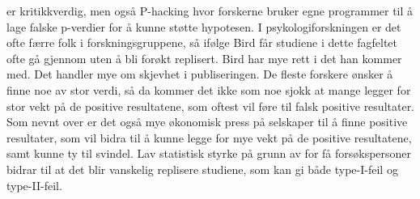 \documentclass[
]{book}
\begin{document}
er kritikkverdig, men også P-hacking hvor forskerne bruker egne programmer til å lage falske p-verdier for å kunne støtte hypotesen. I psykologiforskningen er det ofte færre folk i forskningsgruppene, så ifølge Bird får studiene i dette fagfeltet ofte gå gjennom uten å bli forøkt replisert. Bird har mye rett i det han kommer med. Det handler mye om skjevhet i publiseringen. De fleste forskere ønsker å finne noe av stor verdi, så da kommer det ikke som noe sjokk at mange legger for stor vekt på de positive resultatene, som oftest vil føre til falsk positive resultater. Som nevnt over er det også mye økonomisk press på selskaper til å finne positive resultater, som vil bidra til å kunne legge for mye vekt på de positive resultatene, samt kunne ty til svindel. Lav statistisk styrke på grunn av for få forsøkspersoner bidrar til at det blir vanskelig replisere studiene, som kan gi både type-I-feil og type-II-feil.

  
\end{document}
